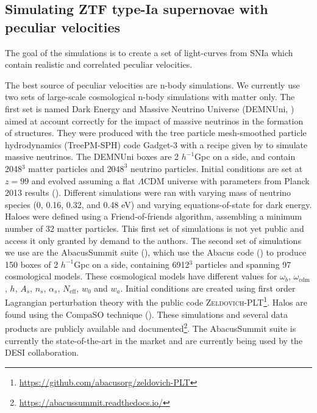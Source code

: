 \subsection{Simulating ZTF type-Ia supernovae with peculiar velocities}
\label{velocities:ztf_fs8:sims}

The goal of the simulations is to create a set of light-curves from SNIa 
which contain realistic and correlated peculiar velocities. 

The best source of peculiar velocities are n-body simulations. 
We currently use two sets of large-scale cosmological n-body simulations 
with matter only. The first set is named Dark Energy and Massive Neutrino Universe 
(DEMNUni, \cite{castorinaDEMNUniClusteringLargescale2015}) aimed at account correctly for 
the impact of massive neutrinos in the formation of structures. 
They were produced with the tree particle mesh-smoothed particle hydrodynamics 
(TreePM-SPH) code Gadget-3 with a recipe given by \cite{vielEffectNeutrinosMatter2010} 
to simulate massive neutrinos. The DEMNUni boxes are 2 $h^{-1}$Gpc on a side, 
and contain 2048$^3$ matter particles and $2048^3$ neutrino particles. Initial conditions 
are set at $z=99$ and evolved assuming a flat $\Lambda$CDM universe with parameters 
from Planck 2013 results (\cite{planckcollaborationPlanck2013Results2014a}). 
Different simulations were ran with varying mass of neutrino species (0, 0.16, 0.32, and 0.48 eV)
and varying equations-of-state for dark energy. 
Haloes were defined using a Friend-of-friends algorithm, assembling a minimum number of 32 
matter particles. This first set of simulations is not yet public and access it only granted 
by demand to the authors. 
The second set of simulations we use are the AbacusSummit suite (\cite{maksimovaABACUSSUMMITMassiveSet2021}), 
which use the Abacus code (\cite{garrisonABACUSCosmologicalNbody2021}) to produce 
150 boxes of 2 $h^{-1}$Gpc on a side, containing 6912$^3$ particles and 
spanning 97 cosmological models. These cosmological models have different 
values for $\omega_b$, $\omega_\text{cdm}$, $h$, $A_s$, $n_s$, $\alpha_s$, 
$N_\text{eff}$, $w_0$ and $w_a$. Initial conditions are created using 
first order Lagrangian perturbation theory with the public code
\textsc{Zeldovich-PLT}\footnote{\url{https://github.com/abacusorg/zeldovich-PLT}}.
Halos are found using the CompaSO technique (\cite{hadzhiyskaCOMPASONewHalo2022}).
These simulations and several data products are publicly available and 
documented\footnote{\url{https://abacussummit.readthedocs.io/}}. 
The AbacusSummit suite is currently the state-of-the-art in the market 
and are currently being used by the DESI collaboration. 

